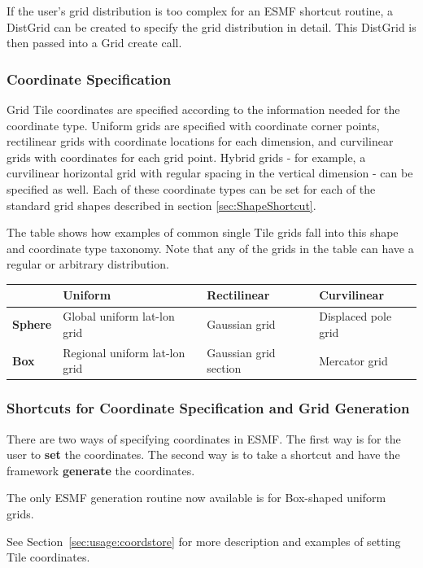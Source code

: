 If the user's grid distribution is too complex for an ESMF shortcut routine,
a DistGrid can be created to specify the grid distribution
in detail.  This DistGrid is then passed into a Grid create call.

\subsubsection{Coordinate Specification}

Grid Tile coordinates are specified
according to the information needed for the coordinate type.
Uniform grids are specified with coordinate corner
points, rectilinear grids with coordinate locations for each dimension,
and curvilinear grids with coordinates for each grid point.  Hybrid
grids - for example, a curvilinear horizontal grid with regular spacing
in the vertical dimension - can be specified as well.  Each of these
coordinate types can be set for each of the standard grid shapes
described in section \ref{sec:ShapeShortcut}.  

The table shows how examples of common single Tile grids fall 
into this shape and coordinate type taxonomy.  Note that any
of the grids in the table can have a regular or arbitrary distribution.

\medskip
\begin{tabular}{|p{.9in}|p{1.7in}|p{1.7in}|p{1.7in}|}
\hline
 & {\bf Uniform} & {\bf Rectilinear} & {\bf Curvilinear} \\ 
\hline
{\bf Sphere} & Global uniform lat-lon grid & Gaussian grid & Displaced pole grid \\
\hline
{\bf Box} & Regional uniform lat-lon grid & Gaussian grid section & Mercator grid \\
\hline
\end{tabular}

\subsubsection{Shortcuts for Coordinate Specification and Grid Generation}

There are two ways of specifying coordinates in ESMF.  The
first way is for the user to {\bf set} the coordinates.  The second 
way is to take a shortcut and have the framework {\bf generate}
the coordinates.  

The only ESMF generation routine now available is for Box-shaped
uniform grids.

See Section~\ref{sec:usage:coordstore} for more description and examples of
setting Tile coordinates.

